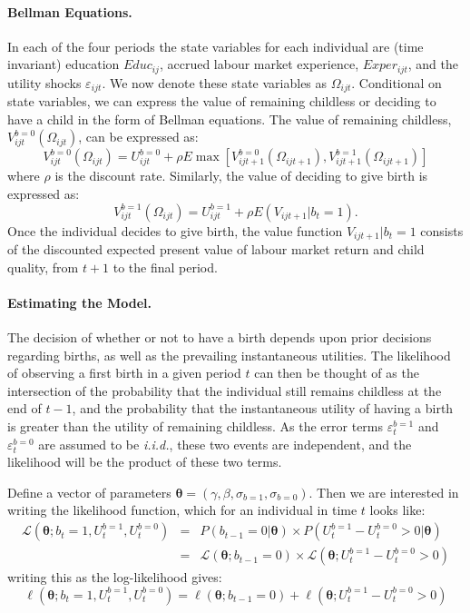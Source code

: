 \documentclass[a4paper, 12 pt]{article}
\theoremstyle{plain}
\begin{document}
\begin{doublespace}
\paragraph{Bellman Equations.} In each of the four periods the state variables
for each individual are (time invariant) education $Educ_{ij}$, accrued labour
market experience, $Exper_{ijt}$, and the utility shocks $\varepsilon_{ijt}$.
We now denote these state variables as $\Omega_{ijt}$.  Conditional on state
variables, we can express the value of remaining childless or deciding to have
a child in the form of Bellman equations.  The value of remaining childless,
$V_{ijt}^{b=0}(\Omega_{ijt})$, can be expressed as:
\begin{equation}
\label{beEqn:VF0}
V_{ijt}^{b=0}(\Omega_{ijt})=U_{ijt}^{b=0}+\rho E\max
                         [V_{ijt+1}^{b=0}(\Omega_{ijt+1}),V_{ijt+1}^{b=1}(\Omega_{ijt+1})]
\end{equation}
where $\rho$ is the discount rate.  Similarly, the value of deciding to give
birth is expressed as:
\begin{equation}
\label{beEqn:VF1}
V_{ijt}^{b=1}(\Omega_{ijt})=U_{ijt}^{b=1}+\rho E(V_{ijt+1}|b_t=1).
\end{equation}
Once the individual decides to give birth, the value function $V_{ijt+1}|b_t=1$
consists of the discounted expected present value of labour market return and
child quality, from $t+1$ to the final period.

\paragraph{Estimating the Model.}
The decision of whether or not to have a birth depends upon prior decisions
regarding births, as well as the prevailing instantaneous utilities.  The
likelihood of observing a first birth in a given period $t$ can then be thought
of as the intersection of the probability that the individual still remains
childless at the end of $t-1$, and the probability that the instantaneous
utility of having a birth is greater than the utility of remaining childless. As
the error terms $\varepsilon_t^{b=1}$ and $\varepsilon_t^{b=0}$ are assumed to
be \emph{i.i.d.}, these two events are independent, and the likelihood will be the
product of these two terms.

Define a vector of parameters $\bm\theta=(\gamma,\beta,\sigma_{b=1},
\sigma_{b=0})$. Then we are interested in writing the likelihood function, which
for an individual in time $t$ looks like:
\begin{eqnarray}
\mathcal{L}(\bm\theta;b_t=1,U_t^{b=1},U_t^{b=0})&=&
P(b_{t-1}=0|\bm\theta) \times P(U_t^{b=1}-U_t^{b=0}>0|\bm\theta) \nonumber \\
& = & \mathcal{L}(\bm\theta;b_{t-1}=0)\times
\mathcal{L}(\bm\theta;U_t^{b=1}-U_t^{b=0}>0) \nonumber
\end{eqnarray}
writing this as the log-likelihood gives:
\begin{equation}
\ell(\bm\theta;b_t=1,U_t^{b=1},U_t^{b=0})= \ell(\bm\theta;b_{t-1}=0)
+ \ell(\bm\theta;U_t^{b=1}-U_t^{b=0}>0)
\end{equation}


\end{doublespace}
\end{document}
